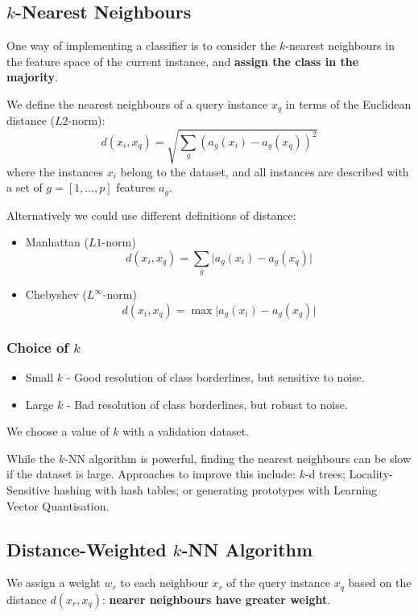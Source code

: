 \documentclass[11pt]{article}
\begin{document}
\subsection{$k$-Nearest Neighbours}
One way of implementing a classifier is to consider the $k$-nearest neighbours in the feature space of the current instance, and \textbf{assign the class in the majority}.

We define the nearest neighbours of a query instance $x_q$ in terms of the Euclidean distance ($L2$-norm):
\[
  d(x_i, x_q) = \sqrt{\sum_g (a_g(x_i) - a_g(x_q))^2}
\]
where the instances $x_i$ belong to the dataset, and all instances are described with a set of $g = [1, \ldots, p]$ features $a_g$.

Alternatively we could use different definitions of distance:
\begin{itemize}
  \item Manhattan ($L1$-norm)
    \[
      d(x_i, x_q) = \sum_g \lvert a_g(x_i) - a_g(x_q) \rvert
    \]
  \item Chebyshev ($L^\infty$-norm)
    \[
      d(x_i, x_q) = \max \lvert a_g(x_i) - a_g(x_q) \rvert
    \]
\end{itemize}

\subsubsection{Choice of $k$}
\begin{itemize}
  \item Small $k$ - Good resolution of class borderlines, but sensitive to noise.
  \item Large $k$ - Bad resolution of class borderlines, but robust to noise.
\end{itemize}

We choose a value of $k$ with a validation dataset.

While the $k$-NN algorithm is powerful, finding the nearest neighbours can be slow if the dataset is large.
Approaches to improve this include: $k$-d trees; Locality-Sensitive hashing with hash tables; or generating prototypes with Learning Vector Quantisation.

\subsection{Distance-Weighted $k$-NN Algorithm}
We assign a weight $w_r$ to each neighbour $x_r$ of the query instance $x_q$ based on the distance $d(x_r, x_q)$: \textbf{nearer neighbours have greater weight}.
\end{document}
